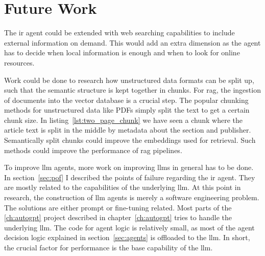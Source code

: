 \documentclass[../main.tex]{subfiles}
\begin{document}
\section{Future Work}

The \gls{ir} agent could be extended with web searching capabilities
to include external information on demand.
This would add an extra dimension as the agent has to decide when local information
is enough and when to look for online resources.

Work could be done to research how unstructured data formats can be split up,
such that the semantic structure is kept together in chunks.
For \gls{rag}, the ingestion of documents into the vector database is a crucial step.
The popular chunking methods for unstructured data like PDFs simply split the text to get a certain chunk size.
In listing~\ref{lst:two_page_chunk} we have seen a chunk where the article text is split in the middle
by metadata about the section and publisher.
Semantically split chunks could improve the embeddings used for retrieval.
Such methods could improve the performance of \gls{rag} pipelines.

To improve \gls{llm} agents, more work on improving \glspl{llm} in
general has to be done.
In section~\ref{sec:pof} I described the points of failure regarding the \gls{ir} agent.
They are mostly related to the capabilities of the underlying \gls{llm}.
At this point in research,
the construction of \gls{llm} agents is merely a software engineering problem.
The solutions are either prompt or fine-tuning related.
Most parts of the \ref{ch:autogpt} project described in chapter~\ref{ch:autogpt} tries
to handle the underlying \gls{llm}.
The code for agent logic is relatively small, as most of the agent decision logic
explained in section~\ref{sec:agents} is offloaded to the \gls{llm}.
In short, the crucial factor for performance is the base capability of the \gls{llm}.
\end{document}
